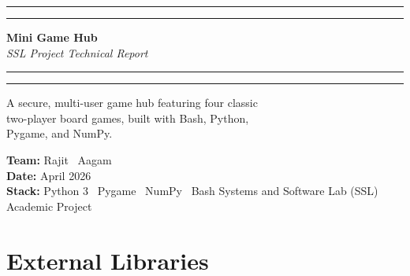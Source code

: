 \documentclass[12pt,a4paper]{article}
\begin{document}
\begin{titlepage}
\centering\vspace*{2.5cm}
{\color{primary}\rule{\linewidth}{1.5pt}}\vspace{6pt}
{\color{primary}\rule{\linewidth}{0.4pt}}\vspace{1.2cm}

{\Huge\bfseries\color{primary} Mini Game Hub}\\\vspace{0.4cm}
{\large\itshape SSL Project Technical Report}\\\vspace{1cm}

{\color{primary}\rule{\linewidth}{0.4pt}}\vspace{6pt}
{\color{primary}\rule{\linewidth}{1.5pt}}\vspace{2cm}

\begin{tcolorbox}[colback=codebg,colframe=primary!50,arc=5pt,width=0.82\textwidth]
\centering\large
A secure, multi-user game hub featuring four classic\\
two-player board games, built with Bash, Python,\\
Pygame, and NumPy.
\end{tcolorbox}

\vspace{2cm}
{\large\textbf{Team:} Rajit \textbullet\ Aagam}\\[0.5cm]
{\large\textbf{Date:} April 2026}\\[0.5cm]
{\large\textbf{Stack:} Python 3 \textbullet\ Pygame \textbullet\ NumPy \textbullet\ Bash}
\vfill
{\color{gray}\small Systems and Software Lab (SSL) Academic Project}
\end{titlepage}

\tableofcontents
\newpage

\section{External Libraries}
\end{document}
